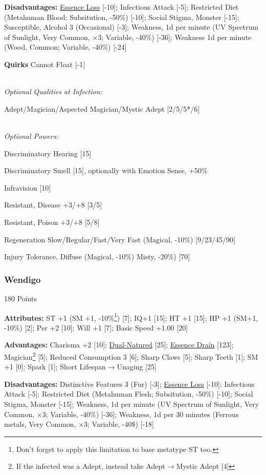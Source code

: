 \begin{multicols*}{3}
	\textbf{Disadvantages:}	
	\hyperref[essence_loss]{Essence Loss} [-10]; Infectious Attack [-5]; Restricted Diet (Metahuman Blood; Subsitution, -50\%) [-10]; Social Stigma, Monster [-15]; Susceptible, Alcohol 3 (Occasional) [-3]; Weakness, 1d per minute (UV Spectrum of Sunlight, Very Common, $\times$3; Variable, -40\%) [-36]; Weakness 1d per minute (Wood, Common; Variable, -40\%) [-24]
	
	\textbf{Quirks} 
	Cannot Float [-1]
	
	\textit{\\Optional Qualities at Infection:}
	
	Adept/Magician/Aspected Magician/Mystic Adept [2/5/5*/6]	
	
	\textit{\\Optional Powers:}
		
	Discriminatory Hearing [15]
	
	Discriminatory Smell [15], optionally with Emotion Sense, +50\%
	
	Infravision [10]
	
	Resistant, Disease +3/+8 [3/5]
	
	Resistant, Poison +3/+8 [5/8]
	
	Regeneration Slow/Regular/Fast/Very Fast (Magical, -10\%) [9/23/45/90]
	
	Injury Tolerance, Diffuse (Magical, -10\%) Misty, -20\%) [70]
	
	\subsubsection{Wendigo}\label{wendigo}
	\begin{flushright}
		180 Points
	\end{flushright}
		
	\textbf{Attributes:}
	ST +1 (SM +1, -10\%\footnote{Don't forget to apply this limitation to base metatype ST too.}) [7]; IQ+1 [15]; HT +1 [15]; HP +1 (SM+1, -10\%) [2]; Per +2 [10]; Will +1 [7]; Basic Speed +1.00 [20]
	
	\textbf{Advantages:}
	Charisma +2 [10]; \hyperref[dual_natured]{Dual-Natured} [25]; \hyperref[essence_drain]{Essence Drain} [123]; Magician\footnote{If the infected was a Adept, instead take Adept$\rightarrow$Mystic Adept [4]} [5]; Reduced Consumption 3 [6]; Sharp Claws [5]; Sharp Teeth [1]; SM +1 [0]; Spark [1]; Short Lifespan$\rightarrow$Unaging [25]
	
	\textbf{Disadvantages:}	
	Distinctive Features 3 (Fur) [-3]; \hyperref[essence_loss]{Essence Loss} [-10]; Infectious Attack [-5]; Restricted Diet (Metahuman Flesh; Subsitution, -50\%) [-10]; Social Stigma, Monster [-15]; Weakness, 1d per minute (UV Spectrum of Sunlight, Very Common, $\times$3; Variable, -40\%) [-36]; Weakness, 1d per 30 minutes (Ferrous metals, Very Common, $\times$3; Variable, -40\$) [-18]
		

\end{multicols*}
